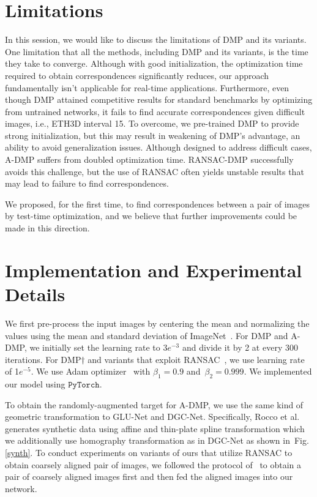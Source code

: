 \documentclass[10pt,twocolumn,letterpaper]{article}
\newcommand{\figref}[1]{Fig. \ref{#1}}
\begin{document}
\section{Limitations}\label{limit}
In this session, we would like to discuss the limitations of DMP and its variants. One limitation that all the methods, including DMP and its variants, is the time they take to converge. Although with good initialization, the optimization time required to obtain correspondences significantly reduces, our approach fundamentally isn't applicable for real-time applications. Furthermore, even though DMP attained competitive results for standard benchmarks by optimizing from untrained networks, it fails to find accurate correspondences given difficult images, i.e., ETH3D interval 15. To overcome, we pre-trained DMP to provide strong initialization, but this may result in weakening of DMP's advantage, an ability to avoid generalization issues. Although designed to address difficult cases, A-DMP suffers from doubled optimization time. RANSAC-DMP successfully avoids this challenge, but the use of RANSAC often yields unstable results that may lead to failure to find correspondences. 

We proposed, for the first time, to find correspondences between a pair of images by test-time optimization, and we believe that further improvements could be made in this direction. 

\section{Implementation and Experimental Details}\label{sec:3}
We first pre-process the input images by centering the mean and normalizing the values using the mean and standard deviation of ImageNet~\cite{deng2009imagenet}. For DMP and A-DMP, we initially set the learning rate to 3$e^{-3}$ and divide it by 2 at every 300 iterations. For DMP$\dagger$ and variants that exploit RANSAC~\cite{shen2020ransac}, we use learning rate of 1$e^{-5}$. We use Adam optimizer~\cite{kingma2014adam} with $\beta_1 = 0.9$ and~$\beta_2=0.999$. We implemented our model using $\texttt{PyTorch}$\cite{paszke2017automatic}. 

To obtain the randomly-augmented target for A-DMP, we use the same kind of geometric transformation to GLU-Net and DGC-Net. 
Specifically, Rocco et al.~\cite{rocco2017convolutional} generates synthetic data using affine and thin-plate spline transformation which we additionally use homography transformation as in DGC-Net as shown in~\figref{synth}. To conduct experiments on variants of ours that utilize RANSAC to obtain coarsely aligned pair of images, we followed the protocol of~\cite{shen2020ransac} to obtain a pair of coarsely aligned images first and then fed the aligned images into our network.
\end{document}

